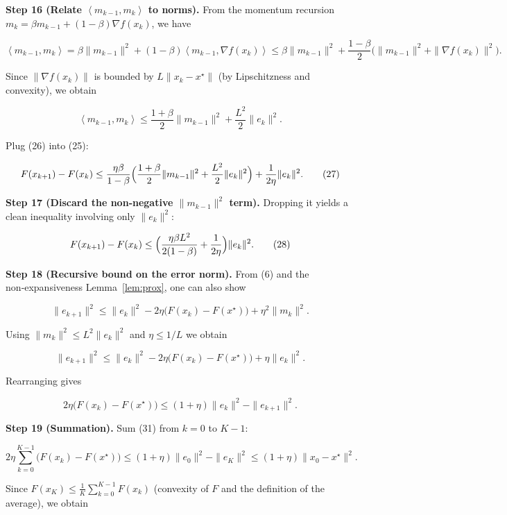 \documentclass{article}
\newcommand{\inner}[2]{\left\langle #1,#2\right\rangle}
\begin{document}
\noindent\textbf{Step 16 (Relate $\inner{m_{k-1}}{m_{k}}$ to norms).}  
From the momentum recursion $m_{k}= \beta m_{k-1}+(1-\beta)\nabla f(x_{k})$, we have  

\[
\inner{m_{k-1}}{m_{k}}
= \beta\|m_{k-1}\|^{2}+(1-\beta)\inner{m_{k-1}}{\nabla f(x_{k})}
\le \beta\|m_{k-1}\|^{2}+\frac{1-\beta}{2}\bigl(\|m_{k-1}\|^{2}+\|\nabla f(x_{k})\|^{2}\bigr).
\]

Since $\|\nabla f(x_{k})\|$ is bounded by $L\|x_{k}-x^{\star}\|$ (by Lipschitzness and convexity), we obtain  

\[
\inner{m_{k-1}}{m_{k}}\le \frac{1+\beta}{2}\|m_{k-1}\|^{2}+\frac{L^{2}}{2}\|e_{k}\|^{2}.
\tag{26}
\]

Plug (26) into (25):

\[
F(x_{k+1})-F(x_{k})
\le \frac{\eta\beta}{1-\beta}\Bigl(\frac{1+\beta}{2}\|m_{k-1}\|^{2}+\frac{L^{2}}{2}\|e_{k}\|^{2}\Bigr)
   +\frac{1}{2\eta}\|e_{k}\|^{2}.
\tag{27}
\]

\noindent\textbf{Step 17 (Discard the non‑negative $\|m_{k-1}\|^{2}$ term).}  
Dropping it yields a clean inequality involving only $\|e_{k}\|^{2}$:

\[
F(x_{k+1})-F(x_{k})
\le \Bigl(\frac{\eta\beta L^{2}}{2(1-\beta)}+\frac{1}{2\eta}\Bigr)\|e_{k}\|^{2}.
\tag{28}
\]

\noindent\textbf{Step 18 (Recursive bound on the error norm).}  
From (6) and the non‑expansiveness Lemma~\ref{lem:prox}, one can also show  

\[
\|e_{k+1}\|^{2}\le \|e_{k}\|^{2}-2\eta\bigl(F(x_{k})-F(x^{\star})\bigr)+\eta^{2}\|m_{k}\|^{2}.
\tag{29}
\]

Using $ \|m_{k}\|^{2}\le L^{2}\|e_{k}\|^{2}$ and $\eta\le 1/L$ we obtain  

\[
\|e_{k+1}\|^{2}\le \|e_{k}\|^{2}-2\eta\bigl(F(x_{k})-F(x^{\star})\bigr)+\eta\|e_{k}\|^{2}.
\tag{30}
\]

Rearranging gives  

\[
2\eta\bigl(F(x_{k})-F(x^{\star})\bigr)\le (1+\eta)\|e_{k}\|^{2}-\|e_{k+1}\|^{2}.
\tag{31}
\]

\noindent\textbf{Step 19 (Summation).}  
Sum (31) from $k=0$ to $K-1$:

\[
2\eta\sum_{k=0}^{K-1}\bigl(F(x_{k})-F(x^{\star})\bigr)
\le (1+\eta)\|e_{0}\|^{2}-\|e_{K}\|^{2}
\le (1+\eta)\|x_{0}-x^{\star}\|^{2}.
\tag{32}
\]

Since $F(x_{K})\le \frac{1}{K}\sum_{k=0}^{K-1}F(x_{k})$ (convexity of $F$ and the definition of the average), we obtain  
\end{document}
